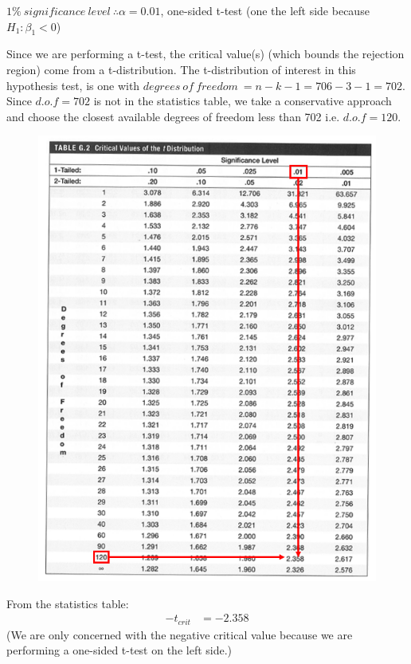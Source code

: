 \documentclass[12pt]{report}
\begin{document}
\noindent $1\%\ significance\ level\ \therefore \alpha = 0.01$, one-sided t-test (one the left side because $H_1: \beta_1 < 0$)

\noindent Since we are performing a t-test, the critical value(s) (which bounds the rejection region) come from a t-distribution. The t-distribution of interest in this hypothesis test, is one with $degrees\ of\ freedom\ = n - k - 1 = 706 - 3 - 1 = 702$. Since $d.o.f = 702$ is not in the statistics table, we take a conservative approach and choose the closest available degrees of freedom less than 702 i.e. $d.o.f=120$. 


\begin{figure}[H]
	\centering
	\includegraphics{tute6_q2_4}
\end{figure}
\vspace{-\baselineskip}
\noindent From the statistics table: \begin{align*}
-t_{crit} &= -2.358 
\end{align*} (We are only concerned with the negative critical value because we are performing a one-sided t-test on the left side.)
\end{document}
